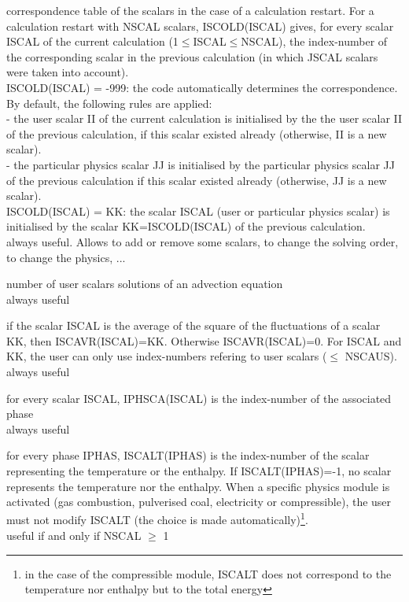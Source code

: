 {correspondence table of the scalars in the case of a calculation
restart. For a calculation restart with NSCAL scalars, ISCOLD(ISCAL)
gives, for every scalar ISCAL of the current calculation
(1$\leqslant$ISCAL$\leqslant$NSCAL), the index-number of the
corresponding scalar in the previous calculation (in which JSCAL scalars were
taken into account).\\
\hspace*{1.3cm} ISCOLD(ISCAL) = -999: the code automatically determines the
correspondence. By default, the following rules are applied:\\
\hspace*{2.cm} - the user scalar II of the current calculation is
initialised by the the user scalar II of the previous calculation, if
this scalar existed already (otherwise, II is a new scalar).\\
\hspace*{2.cm} - the particular physics scalar JJ is initialised by
the particular physics scalar JJ of the previous calculation if this
scalar existed already (otherwise, JJ is a new scalar).\\
\hspace*{1.3cm} ISCOLD(ISCAL) = KK: the scalar ISCAL (user or particular
physics scalar) is initialised by the scalar KK=ISCOLD(ISCAL) of the
previous calculation.\\
always useful. Allows to add or remove some scalars, to change the
solving order, to change the physics, ...}

{number of user scalars solutions of an advection equation\\
always useful}

{if the scalar ISCAL is the average of the square of the fluctuations of a
scalar KK, then \mbox{ISCAVR(ISCAL)=KK}.
Otherwise ISCAVR(ISCAL)=0. For ISCAL and KK, the user can only use index-numbers
refering to user scalars ($\leqslant$ NSCAUS). \\
always useful}

{for every scalar ISCAL, IPHSCA(ISCAL) is the index-number of the
associated phase\\
always useful}

{for every phase IPHAS, ISCALT(IPHAS) is the index-number of the scalar
representing the temperature or the enthalpy. If ISCALT(IPHAS)=-1, no
scalar represents the temperature nor the enthalpy. When a specific
physics module is activated (gas combustion, pulverised coal,
electricity or compressible),
the user must not modify ISCALT (the choice is made
automatically)\footnote{in the case of the compressible module, ISCALT does not
correspond to the temperature nor enthalpy but to the total energy}.\\
useful if and only if NSCAL $\geqslant$ 1}

